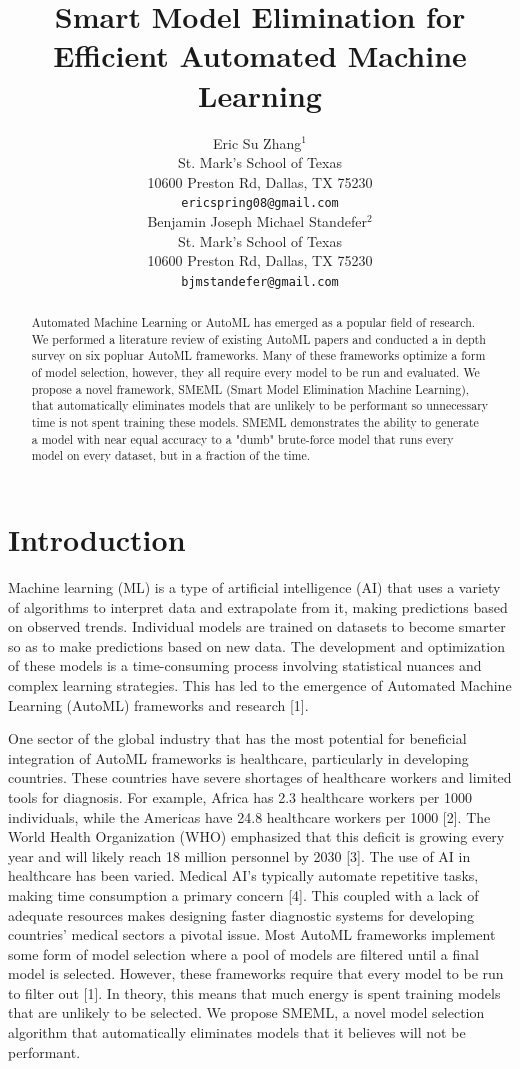 \documentclass{article}
\title{Smart Model Elimination for Efficient Automated Machine Learning}
\author{%
  Eric Su Zhang$^1$ \\
  St. Mark's School of Texas\\
  10600 Preston Rd, Dallas, TX 75230\\
  \texttt{ericspring08@gmail.com} \\
  \And
  Benjamin Joseph Michael Standefer$^2$ \\
  St. Mark's School of Texas \\
  10600 Preston Rd, Dallas, TX 75230 \\
  \texttt{bjmstandefer@gmail.com} \\
}
\begin{document}
\maketitle


\begin{abstract}
  Automated Machine Learning or AutoML has emerged as a popular field of research. We performed a literature review of existing AutoML papers and conducted a in depth survey on six popluar AutoML frameworks. Many of these frameworks optimize a form of model selection, however, they all require every model to be run and evaluated. We propose a novel framework, SMEML (Smart Model Elimination Machine Learning), that automatically eliminates models that are unlikely to be performant so unnecessary time is not spent training these models. SMEML demonstrates the ability to generate a model with near equal accuracy to a "dumb" brute-force model that runs every model on every dataset, but in a fraction of the time.
\end{abstract}


\section{Introduction}

Machine learning (ML) is a type of artificial intelligence (AI) that uses a variety of algorithms to interpret data and extrapolate from it, making predictions based on observed trends. Individual models are trained on datasets to become smarter so as to make predictions based on new data. The development and optimization of these models is a time-consuming process involving statistical nuances and complex learning strategies. This has led to the emergence of Automated Machine Learning (AutoML) frameworks and research [1]. 

One sector of the global industry that has the most potential for beneficial integration of AutoML frameworks is healthcare, particularly in developing countries. These countries have severe shortages of healthcare workers and limited tools for diagnosis. For example, Africa has 2.3 healthcare workers per 1000 individuals, while the Americas have 24.8 healthcare workers per 1000 [2]. The World Health Organization (WHO) emphasized that this deficit is growing every year and will likely reach 18 million personnel by 2030 [3]. The use of AI in healthcare has been varied. Medical AI's typically automate repetitive tasks, making time consumption a primary concern [4]. This coupled with a lack of adequate resources makes designing faster diagnostic systems for developing countries' medical sectors a pivotal issue. 
%
Most AutoML frameworks implement some form of model selection where a pool of models are filtered until a final model is selected. However, these frameworks require that every model to be run to filter out [1]. In theory, this means that much energy is spent training models that are unlikely to be selected. We propose SMEML, a novel model selection algorithm that automatically eliminates models that it believes will not be performant. 
\end{document}
